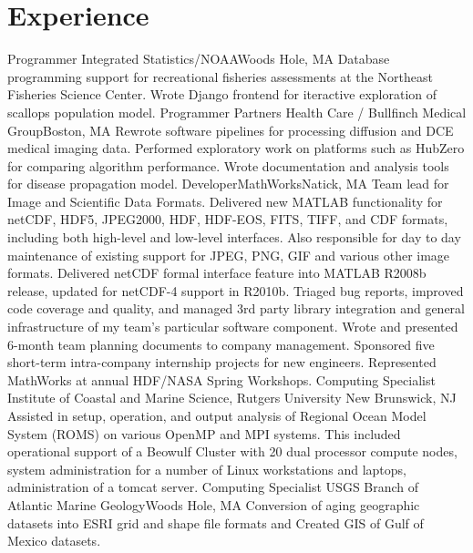\documentclass[11pt]{moderncv}  %
\begin{document}
\section{Experience}
    {Programmer}
    {Integrated Statistics/NOAA}{Woods Hole, MA}{}{
    Database programming support for recreational fisheries assessments
    at the Northeast Fisheries Science Center. Wrote Django frontend
    for iteractive exploration of scallops population model.}
    {Programmer}
    {Partners Health Care / Bullfinch Medical Group}{Boston, MA}{}{
      Rewrote software pipelines for processing diffusion and DCE medical
      imaging data.  Performed exploratory work on platforms such as
      HubZero  for comparing algorithm performance. Wrote documentation
      and analysis tools for disease propagation model.}
    {Developer}{MathWorks}{Natick, MA}{}
        {Team lead for Image and Scientific Data Formats.  Delivered new
        MATLAB functionality for netCDF, HDF5, JPEG2000, HDF, HDF-EOS,
        FITS, TIFF, and CDF formats, including both high-level and
        low-level interfaces.  Also responsible for day to day maintenance
        of existing support for JPEG, PNG, GIF and various other image
        formats.  Delivered netCDF formal interface feature into MATLAB
        R2008b release, updated for netCDF-4 support in R2010b. Triaged
        bug reports, improved code coverage and quality, and managed
        3rd party library integration and general infrastructure of my
        team's particular software component.  Wrote and presented 6-month
        team planning documents to company management.  Sponsored five
        short-term intra-company internship projects for new engineers.
        Represented MathWorks at annual HDF/NASA Spring Workshops.}
    {Computing Specialist}
    {Institute of Coastal and Marine Science, Rutgers University}
    {New Brunswick, NJ}{}
      {Assisted in setup,  operation, and output analysis  of Regional
      Ocean Model System (ROMS) on various OpenMP and MPI systems.
      This included operational support of a Beowulf Cluster with 20
      dual processor compute nodes, system administration for a number of
      Linux workstations and laptops, administration of a tomcat server.}
    {Computing Specialist}
    {USGS Branch of Atlantic Marine Geology}{Woods Hole, MA}{}
      {Conversion of aging geographic datasets into ESRI grid and
      shape file formats and Created GIS of Gulf of Mexico datasets.}
\end{document}
